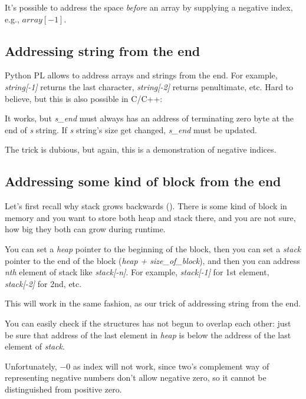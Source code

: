 \label{negative_array_indices}

It's possible to address the space \emph{before} an array by supplying a negative index, e.g., $array[-1]$.

\subsection{Addressing string from the end}

Python \ac{PL} allows to address arrays and strings from the end.
For example, \emph{string[-1]} returns the last character, \emph{string[-2]} returns penultimate, etc.
Hard to believe, but this is also possible in C/C++:



It works, but \textit{s\_end} must always has an address of terminating zero byte at the end of \textit{s} string.
If \textit{s} string's size get changed, \textit{s\_end} must be updated.

The trick is dubious, but again, this is a demonstration of negative indices.

\subsection{Addressing some kind of block from the end}

Let's first recall why stack grows backwards ().
There is some kind of block in memory and you want to store both heap and stack there, and you are not sure,
how big they both can grow during runtime.

You can set a \emph{heap} pointer to the beginning of the block,
then you can set a \emph{stack} pointer to the end of the block (\emph{heap + size\_of\_block}),
and then you can address \emph{nth} element of stack like \emph{stack[-n]}.
For example, \emph{stack[-1]} for 1st element, \emph{stack[-2]} for 2nd, etc.

This will work in the same fashion, as our trick of addressing string from the end.

You can easily check if the structures has not begun to overlap each other:
just be sure that address of the last element in \emph{heap} is below the address of the last element of \emph{stack}.

Unfortunately, $-0$ as index will not work,
since two's complement way of representing negative numbers don't allow negative zero,
so it cannot be distinguished from positive zero.

